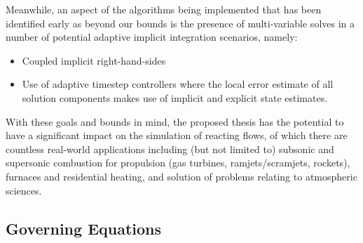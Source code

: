 Meanwhile, an aspect of the algorithms being implemented that has been identified
early as beyond our bounds is the presence of multi-variable solves in a number of
potential adaptive implicit integration scenarios, namely:
\begin{itemize}
\item{Coupled implicit right-hand-sides}
\item{Use of adaptive timestep controllers where the local error estimate
      of all solution components makes use of implicit and explicit state
      estimates.}
\end{itemize}

With these goals and bounds in mind, the proposed thesis has the potential to
have a significant impact on the simulation of reacting flows, of which there
are countless real-world applications including (but not limited to) subsonic
and supersonic combustion for propulsion (gas turbines, ramjets/scramjets,
rockets), furnaces and residential heating, and solution of problems relating
to atmospheric sciences.



\subsection{Governing Equations}

